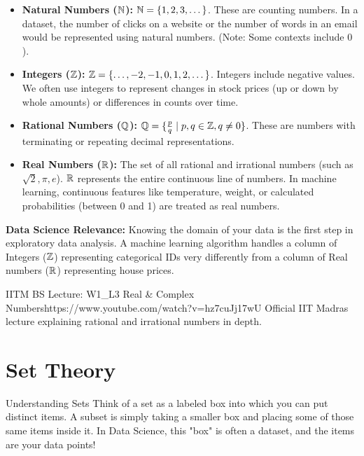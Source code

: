 \begin{itemize}
    \item \textbf{Natural Numbers ($\mathbb{N}$):} $\mathbb{N} = \left\{1, 2, 3, \dots\right\}$. These are counting numbers. In a dataset, the number of clicks on a website or the number of words in an email would be represented using natural numbers. (Note: Some contexts include $0$).
    \item \textbf{Integers ($\mathbb{Z}$):} $\mathbb{Z} = \left\{\dots, -2, -1, 0, 1, 2, \dots\right\}$. Integers include negative values. We often use integers to represent changes in stock prices (up or down by whole amounts) or differences in counts over time.
    \item \textbf{Rational Numbers ($\mathbb{Q}$):} $\mathbb{Q} = \{ \frac{p}{q} \mid p, q \in \mathbb{Z}, q \neq 0 \}$. These are numbers with terminating or repeating decimal representations. 
    \item \textbf{Real Numbers ($\mathbb{R}$):} The set of all rational and irrational numbers (such as $\sqrt{2}, \pi, e$). $\mathbb{R}$ represents the entire continuous line of numbers. In machine learning, continuous features like temperature, weight, or calculated probabilities (between 0 and 1) are treated as real numbers.
\end{itemize}

\textbf{Data Science Relevance:} Knowing the domain of your data is the first step in exploratory data analysis. A machine learning algorithm handles a column of Integers ($\mathbb{Z}$) representing categorical IDs very differently from a column of Real numbers ($\mathbb{R}$) representing house prices.

\begin{videocard}{IITM BS Lecture: W1\_L3 Real \& Complex Numbers}{https://www.youtube.com/watch?v=hz7cuJj17wU}
Official IIT Madras lecture explaining rational and irrational numbers in depth.
\end{videocard}

\section{Set Theory}

\begin{intuitionbox}{Understanding Sets}
Think of a set as a labeled box into which you can put distinct items. A subset is simply taking a smaller box and placing some of those same items inside it. In Data Science, this "box" is often a dataset, and the items are your data points!
\end{intuitionbox}

